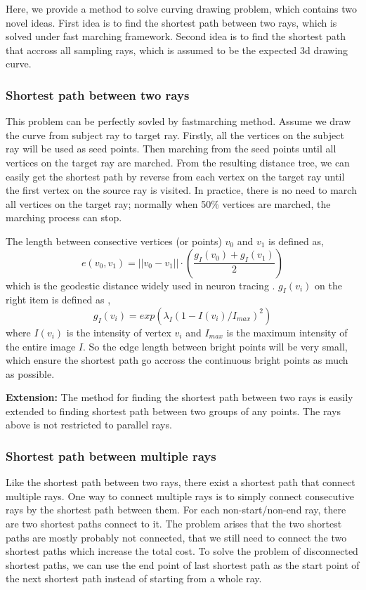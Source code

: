 Here, we provide a method to solve curving drawing problem, which contains two novel ideas. First idea is to find the shortest path between two rays, which is solved under fast marching framework. Second idea is to find the shortest path that accross all sampling rays, which is assumed to be the expected 3d drawing curve.

\subsubsection{Shortest path between two rays}
This problem can be perfectly sovled by fastmarching method. Assume we draw the curve from subject ray to target ray. Firstly, all the vertices on the subject ray will be used as seed points. Then marching from the seed points until all vertices on the target ray are marched. From the resulting distance tree, we can easily get the shortest path by reverse from each vertex on the target ray until the first vertex on the source ray is visited. In practice, there is no need to march all vertices on the target ray; normally when 50\% vertices are marched, the marching process can stop.

The length between consective vertices (or points) $v_0$ and $v_1$ is defined as, 
$$
e(v_0,v_1) = ||v_0 - v_1||\cdot \left( \frac{g_I(v_0) + g_I(v_1)}{2} \right)
$$
which is the geodestic distance widely used in neuron tracing \cite{peng2010automatic, peng2011automatic}. $g_I(v_i)$ on the right item is defined as ,
$$
g_I(v_i) = exp(\lambda_I(1-I(v_i)/I_{max})^2)
$$
where $I(v_i)$ is the intensity of vertex $v_i$ and $I_{max}$ is the maximum intensity of the entire image $I$. So the edge length between bright points will be very small, which ensure the shortest path go accross the continuous bright points as much as possible.

\textbf{Extension:} The method for finding the shortest path between two rays is easily extended to finding shortest path between two groups of any points. The rays above is not restricted to parallel rays.

\subsubsection{Shortest path between multiple rays}
Like the shortest path between two rays, there exist a shortest path that connect multiple rays. One way to connect multiple rays is to simply connect consecutive rays by the shortest path between them. For each non-start/non-end ray, there are two shortest paths connect to it. The problem arises that the two shortest paths are mostly probably not connected, that we still need to connect the two shortest paths which increase the total cost. To solve the problem of disconnected shortest paths, we can use the end point of last shortest path as the start point of the next shortest path instead of starting from a whole ray.


